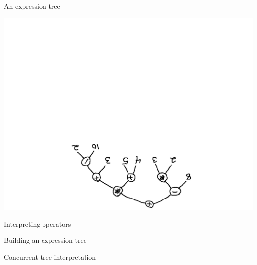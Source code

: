 \documentclass[14pt,t,usepdftitle=false,
xcolornames=x11names,svgnames,dvipsnames]{beamer}
\begin{document}
\begin{frame}[fragile]{An expression tree}
  \vspace{-12mm}
  \begin{center}
    \includegraphics[scale=.5,angle=180]{expr-tree.pdf}
  \end{center}
\end{frame}

\begin{frame}[fragile]{Interpreting operators}
  
\end{frame}

\begin{frame}[fragile]{Building an expression tree}
  
\end{frame}

\begin{frame}[fragile]{Concurrent tree interpretation}
  
\end{frame}
\end{document}
